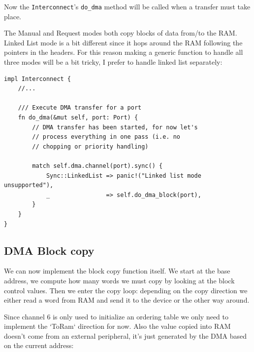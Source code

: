 \documentclass[a4paper]{article}
\newcommand{\code}[1] {\texttt{#1}}
\begin{document}
Now the \code{Interconnect}'s \code{do\_dma} method will be called
when a transfer must take place.

The Manual and Request modes both copy blocks of data from/to the
RAM. Linked List mode is a bit different since it hops around the RAM
following the pointers in the headers. For this reason making a
generic function to handle all three modes will be a bit tricky, I
prefer to handle linked list separately:

\begin{lstlisting}
impl Interconnect {
    //...

    /// Execute DMA transfer for a port
    fn do_dma(&mut self, port: Port) {
        // DMA transfer has been started, for now let's
        // process everything in one pass (i.e. no
        // chopping or priority handling)

        match self.dma.channel(port).sync() {
            Sync::LinkedList => panic!("Linked list mode unsupported"),
            _                => self.do_dma_block(port),
        }
    }
}
\end{lstlisting}

\subsection{DMA Block copy}

We can now implement the block copy function itself. We start at the
base address, we compute how many words we must copy by looking at the
block control values. Then we enter the copy loop: depending on the
copy direction we either read a word from RAM and send it to the
device or the other way around.

Since channel 6 is only used to initialize an ordering table we only
need to implement the `ToRam` direction for now. Also the value copied
into RAM doesn't come from an external peripheral, it's just generated
by the DMA based on the current address:
\end{document}
